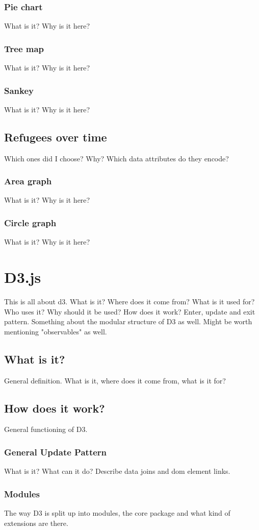 \subsubsection{Pie chart}
What is it? Why is it here?

\subsubsection{Tree map}
What is it? Why is it here?

\subsubsection{Sankey}
What is it? Why is it here?

\subsection{Refugees over time}
Which ones did I choose? Why? Which data attributes do they encode?

\subsubsection{Area graph}
What is it? Why is it here?

\subsubsection{Circle graph}
What is it? Why is it here?


\section{D3.js}
This is all about d3. What is it? Where does it come from? What is it used for? Who uses it? Why should it be used? How does it work? Enter, update and exit pattern. Something about the modular structure of D3 as well. Might be worth mentioning "observables" as well.

\subsection{What is it?}
General definition. What is it, where does it come from, what is it for?

\subsection{How does it work?}
General functioning of D3.

\subsubsection{General Update Pattern}
What is it? What can it do? Describe data joins and dom element links.

\subsubsection{Modules}
The way D3 is split up into modules, the core package and what kind of extensions are there.
